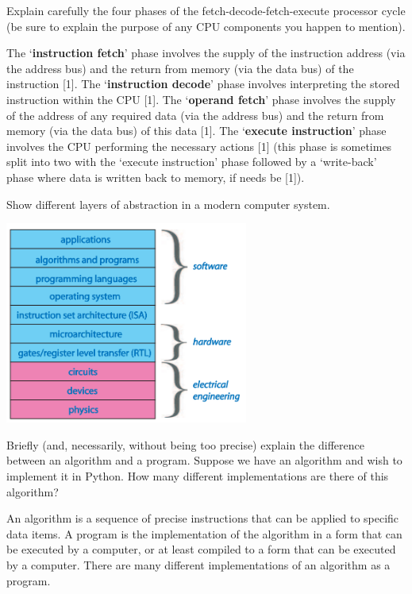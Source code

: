 \documentclass[addpoints]{exam}
\begin{document}
\begin{questions}
\question[5]Explain carefully the four phases of the fetch-decode-fetch-execute processor cycle (be sure to explain the purpose of any CPU components
you happen to mention).
\begin{solution}[2in]
	The ‘\textbf{instruction fetch}’ phase involves the supply of the instruction address
	(via the address bus) and the return from memory (via the data
	bus) of the instruction [1]. The ‘\textbf{instruction decode}’ phase involves
	interpreting the stored instruction within the CPU [1]. The ‘\textbf{operand
		fetch}’ phase involves the supply of the address of any required data (via
	the address bus) and the return from memory (via the data bus) of this
	data [1]. The ‘\textbf{execute instruction}’ phase involves the CPU performing
	the necessary actions [1] (this phase is sometimes split into two with
	the ‘execute instruction’ phase followed by a ‘write-back’ phase where
	data is written back to memory, if needs be [1]).
\end{solution}

\question[4]Show different layers of abstraction in a modern computer system.
\begin{solution}[2in]
	\includegraphics[width=8cm]{CSys.png}
\end{solution}

\question[5]Briefly (and, necessarily, without being too precise) explain the difference
between an algorithm and a program. Suppose we have an
algorithm and wish to implement it in Python. How many different
implementations are there of this algorithm? 
\begin{solution}[2in]
	An algorithm is a sequence of precise instructions that can be applied to specific data items. A program is the implementation of the algorithm in a form that can be executed by a computer, or at least compiled to a form that can be executed by a computer. There are many different implementations of an algorithm as a program.
\end{solution}


\end{questions}
\end{document}
